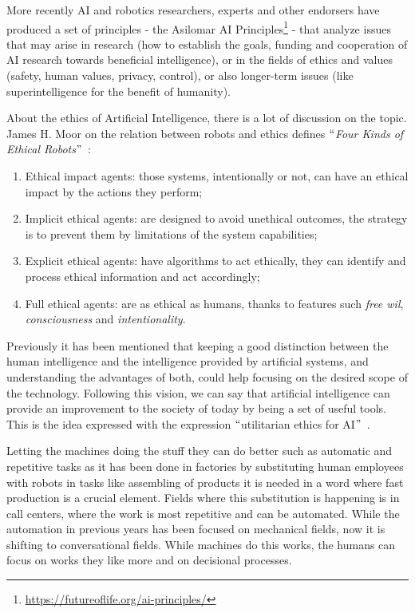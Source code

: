 More recently AI and robotics researchers, experts and other endorsers have produced a set of principles - the Asilomar AI Principles\footnote{\url{https://futureoflife.org/ai-principles/}} - that analyze issues that may arise in research (how to establish the goals, funding and cooperation of AI research towards beneficial intelligence), or in the fields of ethics and values (safety, human values, privacy, control), or also longer-term issues (like superintelligence for the benefit of humanity).

About the ethics of Artificial Intelligence, there is a lot of discussion on the topic. James H. Moor on the relation between robots and ethics defines $``$\textit{Four Kinds of Ethical Robots}$"$~\cite{moor2009four}:

\begin{enumerate}
	\item Ethical impact agents: those systems, intentionally or not, can have an ethical impact by the actions they perform;

	\item Implicit ethical agents: are designed to avoid unethical outcomes, the strategy is to prevent them by limitations of the system capabilities;

	\item Explicit ethical agents: have algorithms to act ethically, they can identify and process ethical information and act accordingly;

	\item Full ethical agents: are as ethical as humans, thanks to features such \textit{free wil}, \textit{consciousness} and \textit{intentionality}.
\end{enumerate}

Previously it has been mentioned that keeping a good distinction between the human intelligence and the intelligence provided by artificial systems, and understanding the advantages of both, could help focusing on the desired scope of the technology. Following this vision, we can say that artificial intelligence can provide an improvement to the society of today by being a set of useful tools. This is the idea expressed with the expression $``$utilitarian ethics for AI$"$~\cite{hibbard2014ethical}.

Letting the machines doing the stuff they can do better such as automatic and repetitive tasks as it has been done in factories by substituting human employees with robots in tasks like assembling of products it is needed in a word where fast production is a crucial element. Fields where this substitution is happening is in call centers, where the work is most repetitive and can be automated. While the automation in previous years has been focused on mechanical fields, now it is shifting to conversational fields. While machines do this works, the humans can focus on works they like more and on decisional processes.

